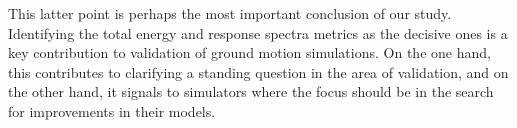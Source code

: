 This latter point is perhaps the most important conclusion of our study. Identifying the total energy and response spectra metrics as the decisive ones is a key contribution to validation of ground motion simulations. On the one hand, this contributes to clarifying a standing question in the area of validation, and on the other hand, it signals to simulators where the focus should be in the search for improvements in their models.


